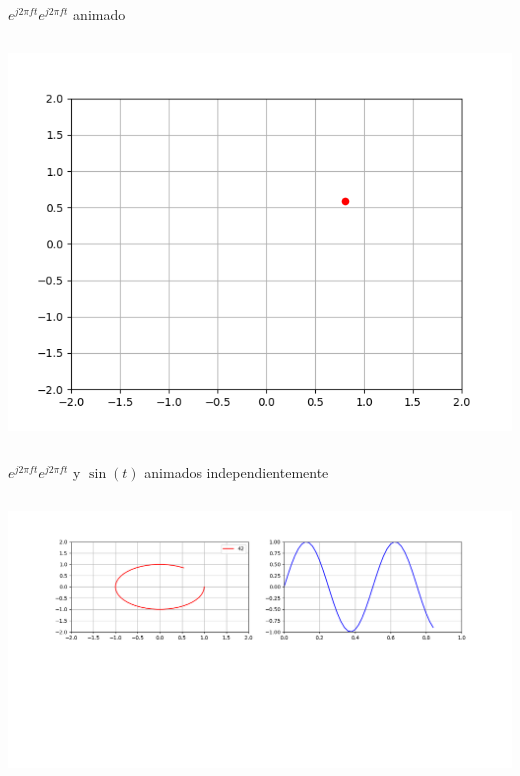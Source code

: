 \begin{frame}{$e^{j2\pi ft}$}{$e^{j2\pi ft}$ animado }
   \handsonicon
   \begin{columns}[onlytextwidth]
      
      \centering\includegraphics[width=1.0\textwidth]{2_clase/euler1}
   \end{columns}
   \vfill
\end{frame}
\begin{frame}{$e^{j2\pi ft}$}{$e^{j2\pi ft}$ y $\sin(t)$ animados independientemente}
   \handsonicon
   \begin{columns}[onlytextwidth]
      
      \centering\includegraphics[width=1.0\textwidth]{2_clase/euler2}
   \end{columns}
   \vfill
\end{frame}
